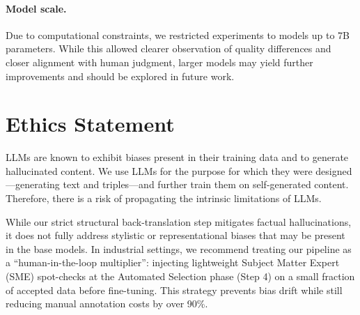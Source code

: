 \documentclass[11pt]{article}
\begin{document}
\paragraph{Model scale.}
Due to computational constraints, we restricted experiments to models up to 7B parameters. While this allowed clearer observation of quality differences and closer alignment with human judgment, larger models may yield further improvements and should be explored in future work.
\section*{Ethics Statement}
LLMs are known to exhibit biases present in their training data and to generate hallucinated content. We use LLMs for the purpose for which they were designed---generating text and triples---and further train them on self-generated content. Therefore, there is a risk of propagating the intrinsic limitations of LLMs.

While our strict structural back-translation step mitigates factual hallucinations, it does not fully address stylistic or representational biases that may be present in the base models. In industrial settings, we recommend treating our pipeline as a ``human-in-the-loop multiplier'': injecting lightweight Subject Matter Expert (SME) spot-checks at the Automated Selection phase (Step 4) on a small fraction of accepted data before fine-tuning. This strategy prevents bias drift while still reducing manual annotation costs by over 90\%.
\end{document}
